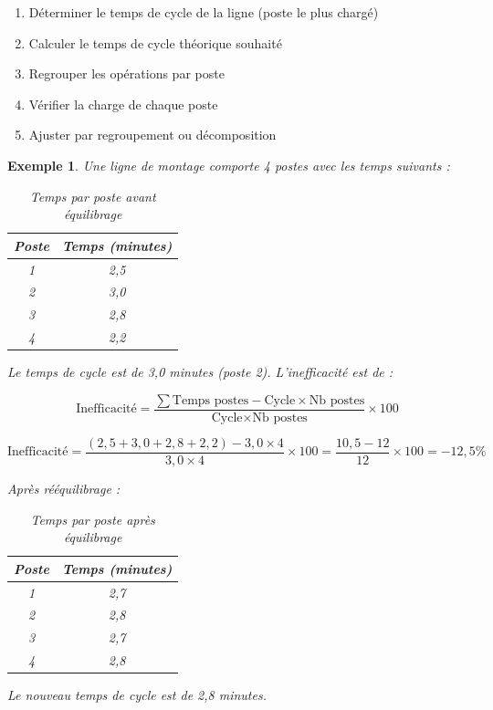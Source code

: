 \documentclass[a4paper,12pt]{article}
\newtheorem{exemple}{Exemple}[section]
\begin{document}
\begin{enumerate}
    \item Déterminer le temps de cycle de la ligne (poste le plus chargé)
    \item Calculer le temps de cycle théorique souhaité
    \item Regrouper les opérations par poste
    \item Vérifier la charge de chaque poste
    \item Ajuster par regroupement ou décomposition
\end{enumerate}

\begin{exemple}
Une ligne de montage comporte 4 postes avec les temps suivants :

\begin{table}[ht]
\centering
\begin{tabular}{|c|c|}
\hline
\textbf{Poste} & \textbf{Temps (minutes)} \\
\hline
1 & 2,5 \\
2 & 3,0 \\
3 & 2,8 \\
4 & 2,2 \\
\hline
\end{tabular}
\caption{Temps par poste avant équilibrage}
\end{table}

Le temps de cycle est de 3,0 minutes (poste 2). L'inefficacité est de :

\[
\text{Inefficacité} = \frac{\sum \text{Temps postes} - \text{Cycle} \times \text{Nb postes}}{\text{Cycle} \times \text{Nb postes}} \times 100
\]

\[
\text{Inefficacité} = \frac{(2,5+3,0+2,8+2,2) - 3,0 \times 4}{3,0 \times 4} \times 100 = \frac{10,5 - 12}{12} \times 100 = -12,5\%
\]

Après rééquilibrage :

\begin{table}[ht]
\centering
\begin{tabular}{|c|c|}
\hline
\textbf{Poste} & \textbf{Temps (minutes)} \\
\hline
1 & 2,7 \\
2 & 2,8 \\
3 & 2,7 \\
4 & 2,8 \\
\hline
\end{tabular}
\caption{Temps par poste après équilibrage}
\end{table}

Le nouveau temps de cycle est de 2,8 minutes.
\end{exemple}
\end{document}
